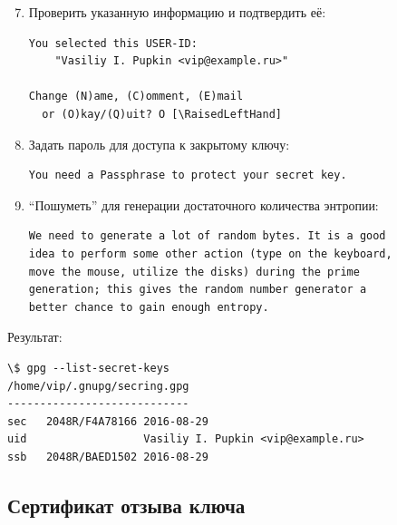 \documentclass[presentation]{beamer}
\newcommand{\RaisedLeftHand}{%
  \raisebox{-.50em}{\Large\HandLeft}
}
\newcommand{\EndOfSectionOrnament}{
  \begin{center}
    \pgfornament[width=0.5\textwidth]{88}
    \end{center}
}
\begin{document}
\begin{frame}[fragile]{}
  \begin{enumerate}
  \setcounter{enumi}{6}
\item Проверить указанную информацию и подтвердить её:
  \small
  \begin{Verbatim}[commandchars=\\\[\]]
You selected this USER-ID:
    "Vasiliy I. Pupkin <vip@example.ru>"

Change (N)ame, (C)omment, (E)mail
  or (O)kay/(Q)uit? O [\RaisedLeftHand]
  \end{Verbatim}
  \normalsize
\item Задать пароль для доступа к закрытому ключу:
  \small
  \begin{Verbatim}[commandchars=\\\[\]]
You need a Passphrase to protect your secret key.
  \end{Verbatim}
  \normalsize
\item ``Пошуметь'' для генерации достаточного количества энтропии:
  \small
  \begin{Verbatim}[commandchars=\\\[\]]
We need to generate a lot of random bytes. It is a good 
idea to perform some other action (type on the keyboard,
move the mouse, utilize the disks) during the prime
generation; this gives the random number generator a
better chance to gain enough entropy.
  \end{Verbatim}
  \normalsize
\end{enumerate}
\end{frame}

\begin{frame}[fragile]{}
  Результат:
  \begin{Verbatim}[commandchars=\\\[\]]
\$ gpg --list-secret-keys
/home/vip/.gnupg/secring.gpg
----------------------------
sec   2048R/F4A78166 2016-08-29
uid                  Vasiliy I. Pupkin <vip@example.ru>
ssb   2048R/BAED1502 2016-08-29
  \end{Verbatim}
  
  \EndOfSectionOrnament
\end{frame}



\subsection{Сертификат отзыва ключа}
\end{document}

